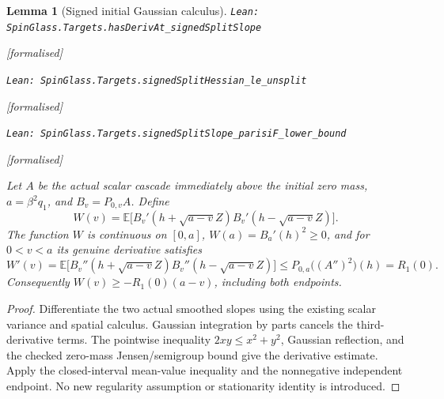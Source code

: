\documentclass[11pt]{article}
\providecommand{\lean}[1]{\leavevmode\par\nopagebreak
  {\noindent\normalfont\footnotesize\raggedright\texttt{Lean: #1}\par}\nopagebreak}
\providecommand{\leanok}{\par\nopagebreak
  {\noindent\normalfont\footnotesize\textcolor{green!50!black}{[formalised]}\par}\nopagebreak}
\newtheorem{lemma}[theorem]{Lemma}
\begin{document}
\begin{lemma}[Signed initial Gaussian calculus]
\lean{SpinGlass.Targets.hasDerivAt\_signedSplitSlope}\leanok
\lean{SpinGlass.Targets.signedSplitHessian\_le\_unsplit}\leanok
\lean{SpinGlass.Targets.signedSplitSlope\_parisiF\_lower\_bound}\leanok
Let $A$ be the actual scalar cascade immediately above the initial zero mass,
$a=\beta^2q_1$, and $B_v=P_{0,v}A$. Define
\[
 W(v)=\mathbb E\bigl[B_v'(h+\sqrt{a-v}Z)B_v'(h-\sqrt{a-v}Z)\bigr].
\]
The function $W$ is continuous on $[0,a]$, $W(a)=B_a'(h)^2\ge0$, and
for $0<v<a$ its genuine derivative satisfies
\[
 W'(v)=\mathbb E\bigl[B_v''(h+\sqrt{a-v}Z)B_v''(h-\sqrt{a-v}Z)\bigr]
 \le P_{0,a}\bigl((A'')^2\bigr)(h)=R_1(0).
\]
Consequently $W(v)\ge-R_1(0)(a-v)$, including both endpoints.
\end{lemma}
\begin{proof}
Differentiate the two actual smoothed slopes using the existing scalar
variance and spatial calculus. Gaussian integration by parts cancels the
third-derivative terms. The pointwise inequality $2xy\le x^2+y^2$,
Gaussian reflection, and the checked zero-mass Jensen/semigroup bound give
the derivative estimate. Apply the closed-interval mean-value inequality
and the nonnegative independent endpoint. No new regularity assumption or
stationarity identity is introduced.
\end{proof}
\end{document}
